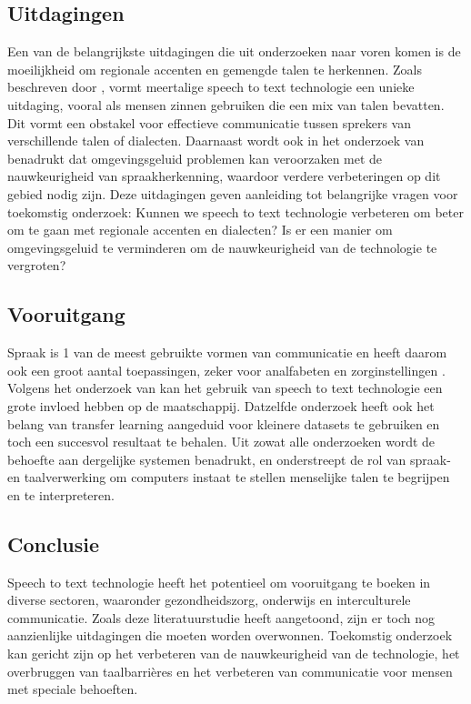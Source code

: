 \subsection{Uitdagingen}
Een van de belangrijkste uitdagingen die uit onderzoeken naar voren komen is de moeilijkheid om regionale accenten en gemengde talen te herkennen. 
Zoals beschreven door \cite{Reddy2022}, vormt meertalige speech to text technologie een unieke uitdaging, vooral als mensen zinnen gebruiken die een mix van talen bevatten. 
Dit vormt een obstakel voor effectieve communicatie tussen sprekers van verschillende talen of dialecten. Daarnaast wordt ook in het onderzoek van \cite{ajami2016use} benadrukt dat omgevingsgeluid problemen kan veroorzaken met de nauwkeurigheid van spraakherkenning, waardoor verdere verbeteringen op dit gebied nodig zijn.
Deze uitdagingen geven aanleiding tot belangrijke vragen voor toekomstig onderzoek: Kunnen we speech to text technologie verbeteren om beter om te gaan met regionale accenten en dialecten? Is er een manier om omgevingsgeluid te verminderen om de nauwkeurigheid van de technologie te vergroten?


\subsection{Vooruitgang}
Spraak is 1 van de meest gebruikte vormen van communicatie en heeft daarom ook een groot aantal toepassingen, zeker voor analfabeten en zorginstellingen \cite{Arun2021}. Volgens het onderzoek van \cite{Roepke2019} kan het gebruik van speech to text technologie een grote invloed hebben op de maatschappij. Datzelfde onderzoek heeft ook het belang van transfer learning aangeduid voor kleinere datasets te gebruiken en toch een succesvol resultaat te behalen. Uit zowat alle onderzoeken wordt de behoefte aan dergelijke systemen benadrukt, en onderstreept de rol van spraak- en taalverwerking om computers instaat te stellen menselijke talen te begrijpen en te interpreteren.

\subsection{Conclusie}
Speech to text technologie heeft het potentieel om vooruitgang te boeken in diverse sectoren, waaronder gezondheidszorg, onderwijs en interculturele communicatie. Zoals deze literatuurstudie heeft aangetoond, zijn er toch nog aanzienlijke uitdagingen die moeten worden overwonnen. Toekomstig onderzoek kan gericht zijn op het verbeteren van de nauwkeurigheid van de technologie, het overbruggen van taalbarrières en het verbeteren van communicatie voor mensen met speciale behoeften.

